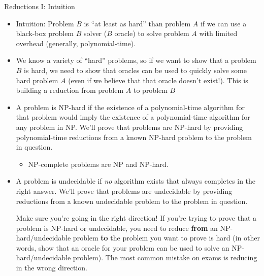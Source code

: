 \documentclass{beamer}
\begin{document}
\begin{frame}[t]{Reductions I: Intuition}
    \begin{itemize}
        \item \alert{Intuition:} Problem $B$ is ``at least as hard'' than problem $A$ if we can use a black-box problem $B$ solver ($B$ oracle) to solve problem $A$ with limited overhead (generally, polynomial-time).
        \item \pause We know a variety of ``hard'' problems, so if we want to show that a problem $B$ is hard, we need to show that oracles can be used to quickly solve some hard problem $A$ (even if we believe that that oracle doesn't exist!). This is building a \alert{reduction from} problem $A$ \alert{to} problem $B$
        \item \pause A problem is \alert{NP-hard} if the existence of a polynomial-time algorithm for that problem would imply the existence of a polynomial-time algorithm for any problem in NP. We'll prove that problems are NP-hard by providing \alert{polynomial-time} reductions from a known NP-hard problem to the problem in question.
        \begin{itemize}
            \item \alert{NP-complete} problems are NP and NP-hard.
        \end{itemize}
        \item \pause A problem is \alert{undecidable} if \textit{no} algorithm exists that always completes in the right answer.  We'll prove that problems are undecidable by providing reductions from a known undecidable problem to the problem in question.
        \pause \begin{alertblock}{Make sure you're going in the right direction!}
            If you're trying to prove that a problem is NP-hard or undecidable, you need to reduce \textbf{from} an NP-hard/undecidable problem \textbf{to} the problem you want to prove is hard (in other words, show that an oracle for your problem can be used to solve an NP-hard/undecidable problem). The most common mistake on exams is reducing in the wrong direction.
        \end{alertblock}
    \end{itemize}
\end{frame}
\end{document}
